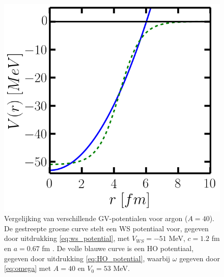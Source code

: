 \documentclass[11pt,twoside]{book}
\begin{document}
\begin{figure}
\centering
\includegraphics[scale=0.4]{./figuren/potentiaal_vgl.png}
\caption{Vergelijking van verschillende GV-potentialen voor argon ($A= 40$). De gestreepte groene curve stelt een WS potentiaal voor, gegeven door uitdrukking \eqref{eq:ws_potential}, met $V_{WS} = -51$ MeV, $c=1.2$ fm en $a= 0.67$ fm . De volle blauwe curve is een HO potentiaal, gegeven door uitdrukking \eqref{eq:HO_potential}, waarbij $\omega$ gegeven door \eqref{eq:omega} met $A = 40$ en $V_0= 53$ MeV.}
\label{fig:hows}
\end{figure}
\end{document}
